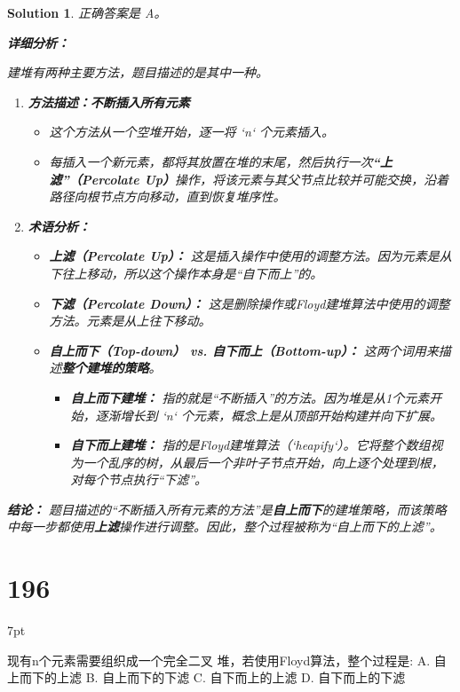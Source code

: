\documentclass[UTF8]{report}
\newtheorem{solution}{Solution}
\theoremstyle{MyLineTheoremStyle} %
\theoremstyle{MyBlockTheoremStyle} %
\theoremstyle{MySubsubsectionStyle} %
\newenvironment{graybox}{%
        \def\FrameCommand{%
        \hspace{1pt}%
        {\color{gray}\small \vrule width 2pt}%
        {\color{graybox_color}\vrule width 4pt}%
        \colorbox{graybox_color}%
        }%
        \MakeFramed{\advance\hsize-\width\FrameRestore}%
        \noindent\hspace{-4.55pt}%
        \begin{adjustwidth}{}{7pt}%
        \vspace{2pt}\vspace{2pt}%
        }
        {%
        \vspace{2pt}\end{adjustwidth}\endMakeFramed%
        }
\begin{document}
\begin{solution}
正确答案是 A。

\textbf{详细分析：}

建堆有两种主要方法，题目描述的是其中一种。

\begin{enumerate}
    \item \textbf{方法描述：不断插入所有元素}
    \begin{itemize}
        \item 这个方法从一个空堆开始，逐一将 `n` 个元素插入。
        \item 每插入一个新元素，都将其放置在堆的末尾，然后执行一次\textbf{“上滤”（Percolate Up）}操作，将该元素与其父节点比较并可能交换，沿着路径向根节点方向移动，直到恢复堆序性。
    \end{itemize}

    \item \textbf{术语分析：}
    \begin{itemize}
        \item \textbf{上滤（Percolate Up）：} 这是插入操作中使用的调整方法。因为元素是从下往上移动，所以这个操作本身是“自下而上”的。
        \item \textbf{下滤（Percolate Down）：} 这是删除操作或Floyd建堆算法中使用的调整方法。元素是从上往下移动。
        \item \textbf{自上而下（Top-down） vs. 自下而上（Bottom-up）：} 这两个词用来描述\textbf{整个建堆的策略}。
            \begin{itemize}
                \item \textbf{自上而下建堆：} 指的就是“不断插入”的方法。因为堆是从1个元素开始，逐渐增长到 `n` 个元素，概念上是从顶部开始构建并向下扩展。
                \item \textbf{自下而上建堆：} 指的是Floyd建堆算法（`heapify`）。它将整个数组视为一个乱序的树，从最后一个非叶子节点开始，向上逐个处理到根，对每个节点执行“下滤”。
            \end{itemize}
    \end{itemize}
\end{enumerate}

\textbf{结论：}
题目描述的“不断插入所有元素的方法”是\textbf{自上而下}的建堆策略，而该策略中每一步都使用\textbf{上滤}操作进行调整。因此，整个过程被称为“自上而下的上滤”。
\end{solution}

\section*{196}
\begin{graybox}
现有n个元素需要组织成一个完全二叉
堆，若使用Floyd算法，整个过程是:
A. 自上而下的上滤
B. 自上而下的下滤
C. 自下而上的上滤
D. 自下而上的下滤
\end{graybox}
\end{document}
